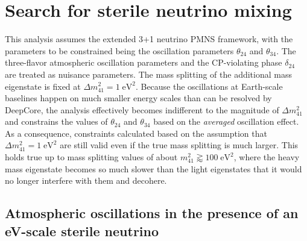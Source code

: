 
\chapter{Search for sterile neutrino mixing}
\setchapterpreamble[u]{\margintoc}
\label{ch:measurement-sterile}

This analysis assumes the extended 3+1 neutrino PMNS framework, with the parameters to be constrained being the oscillation parameters $\theta_{24}$ and $\theta_{34}$. The three-flavor atmospheric oscillation parameters and the CP-violating phase $\delta_{24}$ are treated as nuisance parameters. The mass splitting of the additional mass eigenstate is fixed at $\Delta m^2_{41}=1\;\mathrm{eV^2}$. Because the oscillations at Earth-scale baselines happen on much smaller energy scales than can be resolved by DeepCore, the analysis effectively becomes indifferent to the magnitude of $\Delta m^2_{41}$ and constrains the values of $\theta_{24}$ and $\theta_{34}$ based on the \emph{averaged} oscillation effect. As a consequence, constraints calculated based on the assumption that $\Delta m^2_{41}=1\;\mathrm{eV^2}$ are still valid even if the true mass splitting is much larger. This holds true up to mass splitting values of about $m^2_{41}\gtrapprox100\;\mathrm{eV^2}$, where the heavy mass eigenstate becomes so much slower than the light eigenstates that it would no longer interfere with them and decohere\cite{atmo_decoherence}.

\section{Atmospheric oscillations in the presence of an eV-scale sterile neutrino}


